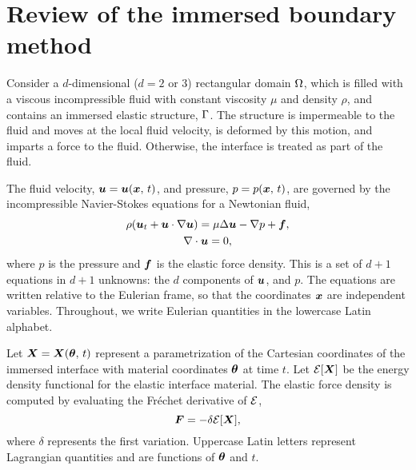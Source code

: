 \section{Review of the immersed boundary method}

Consider a $d$-dimensional ($d=2$ or 3) rectangular domain $\Omega$, which is filled
with a viscous incompressible fluid with constant viscosity $\mu$ and density $\rho$, and
contains an immersed elastic structure, $\Gamma$. The structure is impermeable to the
fluid and moves at the local fluid velocity, is deformed by this motion, and imparts a
force to the fluid. Otherwise, the interface is treated as part of the fluid. 

The fluid velocity, $\boldsymbol{u} = \boldsymbol{u}(\boldsymbol{x},\,t)$, and pressure, $p = p(\boldsymbol{x},\,t)$, are governed by the
incompressible Navier-Stokes equations for a Newtonian fluid,
\begin{gather}
    \label{eq:ins-evol}
    \rho(\u_t + \u\cdot\grad\u) = \mu\Delta\u - \grad p + \f, \\
    \label{eq:ins-incomp}
    \div\u = 0,
\end{gather}
where $p$ is the pressure and $\boldsymbol{f}$ is the elastic force density. This is a set of $d+1$
equations in $d+1$ unknowns: the $d$ components of $\boldsymbol{u}$, and $p$. The equations are
written relative to the Eulerian frame, so that the coordinates $\boldsymbol{x}$ are independent
variables. Throughout, we write Eulerian quantities in the lowercase Latin alphabet.

Let $\boldsymbol{X}=\boldsymbol{X}(\boldsymbol{\theta},\,t)$ represent a parametrization of the Cartesian coordinates of the
immersed interface with material coordinates $\boldsymbol{\theta}$ at time $t$. Let $\mathcal{E}[\boldsymbol{X}]$ be the
energy density functional for the elastic interface material. The elastic force density
is computed by evaluating the Fréchet derivative of $\mathcal{E}$,
\begin{equation}
    \label{eq:forces}
    \boldsymbol{F} = -\delta \mathcal{E}[\boldsymbol{X}],
\end{equation}
where $\delta$ represents the first variation. Uppercase Latin letters represent
Lagrangian quantities and are functions of $\boldsymbol{\theta}$ and $t$.

